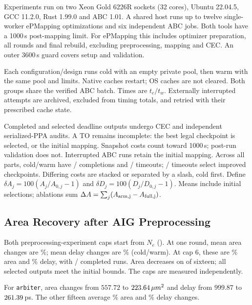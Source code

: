 Experiments run on two Xeon Gold 6226R sockets (32 cores), Ubuntu 22.04.5, GCC 11.2.0, Rust 1.99.0 and ABC 1.01. A shared host runs up to twelve single-worker ePMapping optimizations and six independent ABC jobs. Both tools have a 1000\,s post-mapping limit. For ePMapping this includes optimizer preparation, all rounds and final rebuild, excluding preprocessing, mapping and CEC. An outer 3600\,s guard covers setup and validation.

Each configuration/design runs cold with an empty private pool, then warm with the same pool and limits. Native caches restart; OS caches are not cleared. Both groups share the verified ABC batch. Times are $t_c/t_w$. Externally interrupted attempts are archived, excluded from timing totals, and retried with their prescribed cache state.

Completed and selected deadline outputs undergo CEC and independent serialized-PPA audits. A TO remains incomplete: the best legal checkpoint is selected, or the initial mapping. Snapshot costs count toward 1000\,s; post-run validation does not. Interrupted ABC runs retain the initial mapping. \FullCompletionSentence{} Across all parts, cold/warm have \ColdCompleted{}/\WarmCompleted{} completions and \ColdMethodTimeouts{}/\WarmMethodTimeouts{} timeouts; \ColdCheckpointSelections{}/\WarmCheckpointSelections{} timeouts select improved checkpoints. Differing costs are stacked or separated by a slash, cold first. Define $\delta A_j=100(A_j/A_{0,j}-1)$ and $\delta D_j=100(D_j/D_{0,j}-1)$. Means include initial selections; ablations sum $\Delta A=\sum_j(A_{\rm arm,j}-A_{\rm full,j})$.

\subsection{Area Recovery after AIG Preprocessing}\label{sec:aspdac}

Both preprocessing-experiment caps start from $N_e$ (). At one round, mean area changes are \OwnOneArea\%; mean delay changes are \OwnOneDelay\% (cold/warm). At cap 6, these are \OwnArea\% area and \OwnDelay\% delay, with \ColdMainCompleted{}/\WarmMainCompleted{} completed runs. Area decreases on \OwnAreaWins{} of sixteen; all selected outputs meet the initial bounds. The caps are measured independently.

For \texttt{arbiter}, area changes from $557.72$ to $223.64\,\mu m^2$ and delay from $999.87$ to $261.39$\,ps. The other fifteen average \mbox{\OwnOtherArea\%} area and \mbox{\OwnOtherDelay\%} delay changes.



